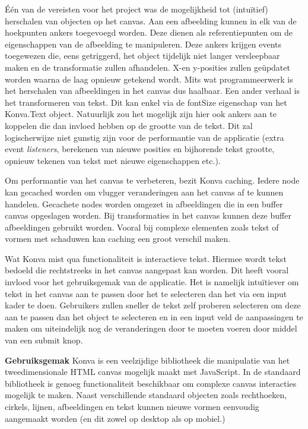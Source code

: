 \'{E}\'{e}n van de vereisten voor het project was de mogelijkheid tot (intu\"{i}tief) herschalen van objecten op het canvas. Aan een afbeelding kunnen in elk van de hoekpunten ankers toegevoegd worden. Deze dienen als referentiepunten om de eigenschappen van de afbeelding te manipuleren. Deze ankers krijgen events toegewezen die, eens getriggerd, het object tijdelijk niet langer versleepbaar maken en de transformatie zullen afhandelen. X-en y-posities zullen ge\"{u}pdatet worden waarna de laag opnieuw getekend wordt. Mits wat programmeerwerk is het herschalen van afbeeldingen in het canvas dus haalbaar. Een ander verhaal is het transformeren van tekst. Dit kan enkel via de fontSize eigenschap van het Konva.Text object. Natuurlijk zou het mogelijk zijn hier ook ankers aan te koppelen die dan invloed hebben op de grootte van de tekst. Dit zal logischerwijze niet gunstig zijn voor de performantie van de applicatie (extra event \textit{listeners}, berekenen van nieuwe posities en bijhorende tekst grootte, opnieuw tekenen van tekst met nieuwe eigenschappen etc.). %

Om performantie van het canvas te verbeteren, bezit Konva caching. Iedere node kan gecached worden om vlugger veranderingen aan het canvas af te kunnen handelen. Gecachete nodes worden omgezet in afbeeldingen die in een buffer canvas opgeslagen worden. Bij transformaties in het canvas kunnen deze buffer afbeeldingen gebruikt worden. Vooral bij complexe elementen zoals tekst of vormen met schaduwen kan caching een groot verschil maken. 

Wat Konva mist qua functionaliteit is interactieve tekst. Hiermee wordt tekst bedoeld die rechtstreeks in het canvas aangepast kan worden. Dit heeft vooral invloed voor het gebruiksgemak van de applicatie. Het is namelijk intu\"{i}tiever om tekst in het canvas aan te passen door het te selecteren dan het via een input kader te doen. Gebruikers zullen sneller de tekst zelf proberen selecteren om deze aan te passen dan het object te selecteren en in een input veld de aanpassingen te maken om uiteindelijk nog de veranderingen door te moeten voeren door middel van een submit knop. 

\newpage
\textbf{Gebruiksgemak} \break
Konva is een veelzijdige bibliotheek die manipulatie van het tweedimensionale HTML canvas mogelijk maakt met JavaScript. In de standaard bibliotheek is genoeg functionaliteit beschikbaar om complexe canvas interacties mogelijk te maken. Naast verschillende standaard objecten zoals rechthoeken, cirkels, lijnen, afbeeldingen en tekst kunnen nieuwe vormen eenvoudig aangemaakt worden (en dit zowel op desktop als op mobiel.)

